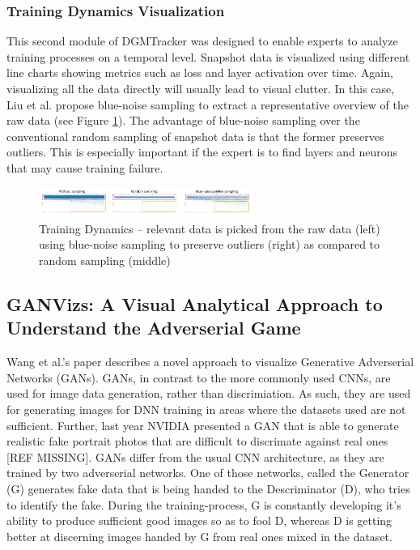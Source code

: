 \documentclass{acmsiggraph}               %
\begin{document}
\subsubsection{Training Dynamics Visualization}
This second module of DGMTracker was designed to enable experts to analyze training processes on a temporal level.
Snapshot data is visualized using different line charts showing metrics such as loss and layer activation over time. Again, visualizing all the data directly will usually lead to visual clutter. In this case, Liu et al. propose blue-noise sampling to extract a representative overview of the raw data (see Figure \ref{fig:mengchen4}). The advantage of blue-noise sampling over the conventional random sampling of snapshot data is that the former preserves outliers. This is especially important if the expert is to find layers and neurons that may cause training failure.

\begin{figure}[!htb]
  \centering
  \includegraphics[width=2.75in]{mengchen4}
  \caption{Training Dynamics -- relevant data is picked from the raw data (left) using blue-noise sampling to preserve outliers (right) as compared to random sampling (middle) \protect\cite{Liu2018}}
  \label{fig:mengchen4}
\end{figure}

\subsection{GANVizs: A Visual Analytical Approach to Understand the Adverserial Game}
Wang et al.'s paper describes a novel approach to visualize Generative Adverserial Networks (GANs). GANs, in contrast to the more commonly used CNNs, are used for image data generation, rather than discrimiation. As such, they are used for generating images for DNN training in areas where the datasets used are not sufficient. Further, last year NVIDIA presented a GAN that is able to generate realistic fake portrait photos that are difficult to discrimate against real ones [REF MISSING]. 
GANs differ from the usual CNN architecture, as they are trained by two adverserial networks. One of those networks, called the Generator (G) generates fake data that is being handed to the Descriminator (D), who tries to identify the fake. During the training-process, G is constantly developing it's ability to produce sufficient good images so as to fool D, whereas D is getting better at discerning images handed by G from real ones mixed in the dataset.
\end{document}
